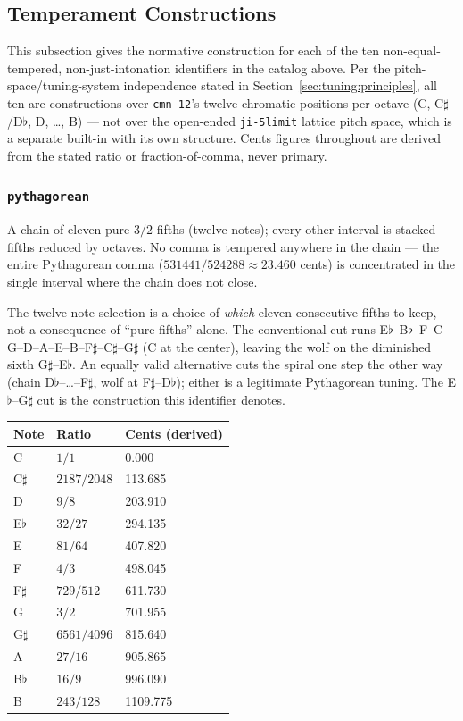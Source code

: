 \documentclass[11pt,letterpaper]{report}
\begin{document}
\subsection{Temperament Constructions}
\label{sec:tuning:temperament-constructions}

This subsection gives the normative construction for each of the ten
non-equal-tempered, non-just-intonation identifiers in the catalog
above. Per the pitch-space/tuning-system independence stated in
Section~\ref{sec:tuning:principles}, all ten are constructions over
\texttt{cmn-12}'s twelve chromatic positions per octave (C,
C$\sharp$/D$\flat$, D, \ldots, B) --- not over the open-ended
\texttt{ji-5limit} lattice pitch space, which is a separate built-in
with its own structure. Cents figures throughout are derived from the
stated ratio or fraction-of-comma, never primary.

\subsubsection{\texttt{pythagorean}}

A chain of eleven pure $3/2$ fifths (twelve notes); every other interval
is stacked fifths reduced by octaves. No comma is tempered anywhere in
the chain --- the entire Pythagorean comma ($531441/524288 \approx
23.460$ cents) is concentrated in the single interval where the chain
does not close.

The twelve-note selection is a choice of \emph{which} eleven consecutive
fifths to keep, not a consequence of ``pure fifths'' alone. The
conventional cut runs E$\flat$--B$\flat$--F--C--G--D--A--E--B--F$\sharp$--C$\sharp$--G$\sharp$
(C at the center), leaving the wolf on the diminished sixth
G$\sharp$--E$\flat$. An equally valid alternative cuts the spiral one
step the other way (chain D$\flat$--\ldots--F$\sharp$, wolf at
F$\sharp$--D$\flat$); either is a legitimate Pythagorean tuning. The
E$\flat$--G$\sharp$ cut is the construction this identifier denotes.

\begin{longtable}{p{1.8cm} p{4.5cm} p{4.5cm}}
  \toprule
  \textbf{Note} & \textbf{Ratio} & \textbf{Cents (derived)} \\
  \midrule
  \endhead
  C & $1/1$ & 0.000 \\
  C$\sharp$ & $2187/2048$ & 113.685 \\
  D & $9/8$ & 203.910 \\
  E$\flat$ & $32/27$ & 294.135 \\
  E & $81/64$ & 407.820 \\
  F & $4/3$ & 498.045 \\
  F$\sharp$ & $729/512$ & 611.730 \\
  G & $3/2$ & 701.955 \\
  G$\sharp$ & $6561/4096$ & 815.640 \\
  A & $27/16$ & 905.865 \\
  B$\flat$ & $16/9$ & 996.090 \\
  B & $243/128$ & 1109.775 \\
  \bottomrule
\end{longtable}
\end{document}
